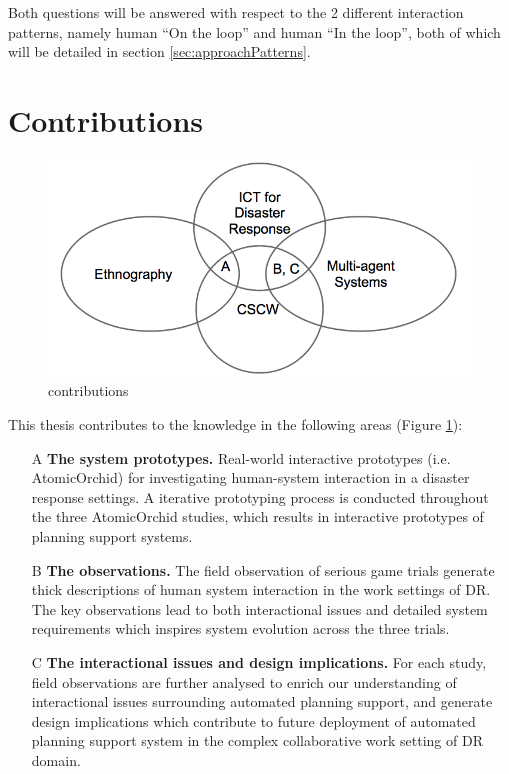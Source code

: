 Both questions will be answered with respect to the 2 different interaction patterns, namely human ``On the loop'' and human ``In the loop'', both of which will be detailed in section \ref{sec:approachPatterns}. 

\section{Contributions} 
\begin{figure}[h]
  \centering
  \includegraphics[scale=0.5]{img/introduction/contributions.png}
  \caption{contributions}
  \label{fig:contributions}
\end{figure}


This thesis contributes to the knowledge in the following areas (Figure \ref{fig:contributions}): \\

\begin{enumerate}
  \item[A] \textbf{The system prototypes.} Real-world interactive prototypes (i.e. AtomicOrchid) for investigating human-system interaction in a disaster response settings. A iterative prototyping process is conducted throughout the three AtomicOrchid studies, which results in interactive prototypes of planning support systems. 
  
  \item[B] \textbf{The observations.} The field observation of serious game trials generate thick descriptions of human system interaction in the work settings of \ac{DR}. The key observations lead to both interactional issues and detailed system requirements which inspires system evolution across the three trials.
  
  \item[C] \textbf{The interactional issues and design implications.} For each study, field observations are further analysed to enrich our understanding of interactional issues surrounding automated planning support, and generate design implications which contribute to future deployment of automated planning support system in the complex collaborative work setting of \ac{DR} domain. 
\end{enumerate}


